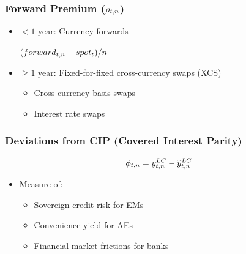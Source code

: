 \documentclass[12pt, aspectratio=169, xcolor=dvipsnames]{beamer}  %
\begin{document}
\begin{frame}
	\frametitle{Forward Premium ($\rho_{t,n}$)}
	\begin{itemize}
		\item $< 1$ year: Currency forwards
		\begin{center}
			$(forward_{t,n} - spot_{t})/n$
		\end{center}
		\item $\geq 1$ year: Fixed-for-fixed cross-currency swaps (XCS)
		\iftoggle{long}{\pause}{}
		\begin{itemize}
			\item Cross-currency basis swaps
			\item Interest rate swaps
		\end{itemize}
	\end{itemize}
\end{frame}


\begin{frame}
	\frametitle{Deviations from CIP (Covered Interest Parity)}
	\vspace{-1cm}
	$$\phi_{t,n} = y_{t,n} ^{LC} - \widetilde{y}_{t,n} ^{LC}$$
	\vspace{-1.2cm}
	\begin{itemize}
		\item Measure of:
		\begin{itemize}
			\item Sovereign credit risk for EMs \citep{DuSchreger:2016JoF}
			\item Convenience yield for AEs \citep*{DuImSchreger:2018JIE}
			\item Financial market frictions for banks \citep*{DuTepperVerdelhan:2018}
		\end{itemize}
	\end{itemize}
\end{frame}
\end{document}
